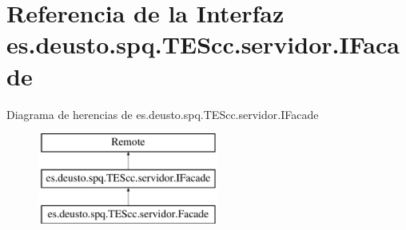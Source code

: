 \hypertarget{interfacees_1_1deusto_1_1spq_1_1_t_e_scc_1_1servidor_1_1_i_facade}{\section{Referencia de la Interfaz es.\+deusto.\+spq.\+T\+E\+Scc.\+servidor.\+I\+Facade}
\label{interfacees_1_1deusto_1_1spq_1_1_t_e_scc_1_1servidor_1_1_i_facade}
}
Diagrama de herencias de es.\+deusto.\+spq.\+T\+E\+Scc.\+servidor.\+I\+Facade\begin{figure}[H]
\begin{center}
\leavevmode
\includegraphics[height=3.000000cm]{interfacees_1_1deusto_1_1spq_1_1_t_e_scc_1_1servidor_1_1_i_facade}
\end{center}
\end{figure}
